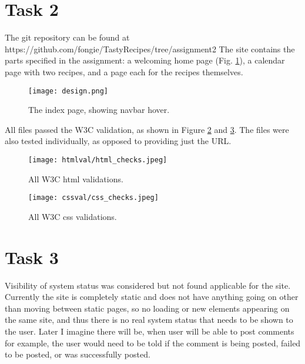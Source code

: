 \documentclass[a4paper]{scrreprt}
\begin{document}
\section{Task 2}

The git repository can be found at https://github.com/fongie/TastyRecipes/tree/assignment2
The site contains the parts specified in the assignment: a welcoming home page (Fig. \ref{fig:design}), a calendar page with two recipes, and a page each for the recipes themselves.

\begin{figure}[h!]
  \begin{center}
    \texttt{[image: design.png]}
    \caption{The index page, showing navbar hover.}
    \label{fig:design}
  \end{center}
\end{figure}

All files passed the W3C validation, as shown in Figure \ref{fig:htmlvalidations} and \ref{fig:cssvalidations}. The files were also tested individually, as opposed to providing just the URL.

\begin{figure}[h!]
  \begin{center}
    \texttt{[image: htmlval/html\_checks.jpeg]}
    \caption{All W3C html validations.}
    \label{fig:htmlvalidations}
  \end{center}
\end{figure}

\begin{figure}[h!]
  \begin{center}
    \texttt{[image: cssval/css\_checks.jpeg]}
    \caption{All W3C css validations.}
    \label{fig:cssvalidations}
  \end{center}
\end{figure}


\section{Task 3}

Visibility of system status was considered but not found applicable for the site. Currently the site is completely static and does not have anything going on other than moving between static pages, so no loading or new elements appearing on the same site, and thus there is no real system status that needs to be shown to the user. Later I imagine there will be, when user will be able to post comments for example, the user would need to be told if the comment is being posted, failed to be posted, or was successfully posted.
\end{document}
